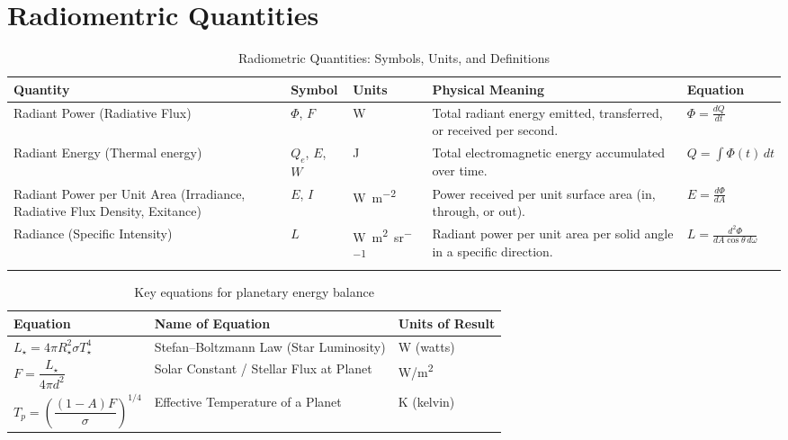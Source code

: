 \documentclass[12pt, a4paper]{article} %
\begin{document}
\section{Radiomentric Quantities}

\begin{table}[H]
\centering
\renewcommand{\arraystretch}{1.3}
\small
\begin{tabularx}{\textwidth}{|X|l|l|X|l|}
\hline
\textbf{Quantity} & \textbf{Symbol} & \textbf{Units} & \textbf{Physical Meaning} & \textbf{Equation} \\
\hline
Radiant Power
\newline (Radiative Flux)
& \( \Phi \), \( F \)
& \si{\watt}
& Total radiant energy emitted, transferred, or received per second.
& \( \Phi = \frac{dQ}{dt} \) \\
\hline
Radiant Energy
\newline (Thermal energy)
& \( Q_e \), \( E \), \( W \)
& \si{\joule}
& Total electromagnetic energy accumulated over time.
& \( Q = \int \Phi(t)\, dt \) \\
\hline
Radiant Power per Unit Area
\newline (Irradiance,
\newline Radiative Flux Density,
\newline Exitance)
& \( E \), \( I \)
& \si{\watt\per\meter\squared}
& Power received per unit surface area (in, through, or out).
& \( E = \frac{d\Phi}{dA} \) \\
\hline
Radiance
\newline (Specific Intensity)
& \( L \)
& \si{\watt\per\meter\squared\per\steradian}
& Radiant power per unit area per solid angle in a specific direction.
& \( L = \frac{d^2\Phi}{dA \cos\theta \, d\omega} \) \\
\hline
\end{tabularx}
\caption{Radiometric Quantities: Symbols, Units, and Definitions}
\end{table}
\begin{table}[h!]
\centering
\begin{tabular}{|l|l|l|}
\hline
\textbf{Equation} & \textbf{Name of Equation} & \textbf{Units of Result} \\
\hline
$L_\star = 4\pi R_\star^2 \sigma T_\star^4$ & Stefan–Boltzmann Law (Star Luminosity) & W (watts) \\
\hline
$F = \dfrac{L_\star}{4\pi d^2}$ & Solar Constant / Stellar Flux at Planet & W/m\textsuperscript{2} \\
\hline
$T_p = \left( \dfrac{(1 - A) F}{\sigma} \right)^{1/4}$ & Effective Temperature of a Planet & K (kelvin) \\
\hline
\end{tabular}
\caption{Key equations for planetary energy balance}
\end{table}
\end{document}
